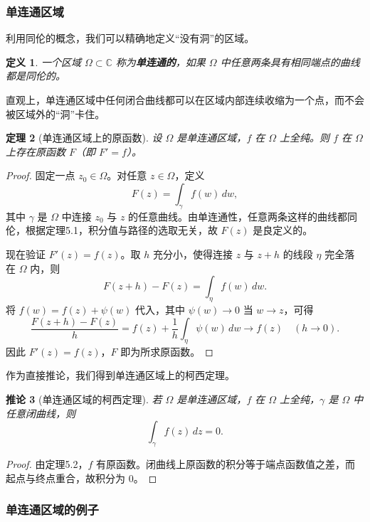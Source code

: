 \documentclass[UTF8]{ctexart}
\newtheorem{theorem}{定理}[section]
\newtheorem{definition}[theorem]{定义}
\newtheorem{corollary}[theorem]{推论}
\numberwithin{equation}{section}
\newcommand{\CC}{\mathbb{C}}
\begin{document}
\subsubsection{单连通区域}

利用同伦的概念，我们可以精确地定义“没有洞”的区域。

\begin{definition}
一个区域 $\Omega\subset\CC$ 称为\textbf{单连通的}，如果 $\Omega$ 中任意两条具有相同端点的曲线都是同伦的。
\end{definition}

直观上，单连通区域中任何闭合曲线都可以在区域内部连续收缩为一个点，而不会被区域外的“洞”卡住。

\begin{theorem}[单连通区域上的原函数]
设 $\Omega$ 是单连通区域，$f$ 在 $\Omega$ 上全纯。则 $f$ 在 $\Omega$ 上存在原函数 $F$（即 $F'=f$）。
\end{theorem}

\begin{proof}
固定一点 $z_0\in\Omega$。对任意 $z\in\Omega$，定义
\[
F(z) = \int_{\gamma} f(w)\,dw ,
\]
其中 $\gamma$ 是 $\Omega$ 中连接 $z_0$ 与 $z$ 的任意曲线。由单连通性，任意两条这样的曲线都同伦，根据定理5.1，积分值与路径的选取无关，故 $F(z)$ 是良定义的。

现在验证 $F'(z)=f(z)$。取 $h$ 充分小，使得连接 $z$ 与 $z+h$ 的线段 $\eta$ 完全落在 $\Omega$ 内，则
\[
F(z+h)-F(z) = \int_{\eta} f(w)\,dw .
\]
将 $f(w)=f(z)+\psi(w)$ 代入，其中 $\psi(w)\to0$ 当 $w\to z$，可得
\[
\frac{F(z+h)-F(z)}{h} = f(z) + \frac{1}{h}\int_{\eta}\psi(w)\,dw \to f(z)\quad(h\to0).
\]
因此 $F'(z)=f(z)$，$F$ 即为所求原函数。
\end{proof}

作为直接推论，我们得到单连通区域上的柯西定理。

\begin{corollary}[单连通区域的柯西定理]
若 $\Omega$ 是单连通区域，$f$ 在 $\Omega$ 上全纯，$\gamma$ 是 $\Omega$ 中任意闭曲线，则
\[
\int_{\gamma} f(z)\,dz = 0 .
\]
\end{corollary}

\begin{proof}
由定理5.2，$f$ 有原函数。闭曲线上原函数的积分等于端点函数值之差，而起点与终点重合，故积分为 $0$。
\end{proof}

\subsubsection{单连通区域的例子}
\end{document}
